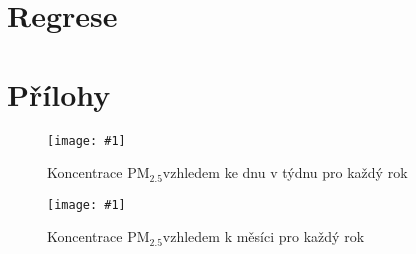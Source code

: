 \documentclass[a4paper,12pt]{article}
\newcommand{\pmQuant}[0]{$\text{PM}_{2.5}$}
\newcommand{\image}[4]{\begin{figure}[ht!] \centering \texttt{[image: \#1]} \caption{#2} \label{#3} \end{figure}}
\begin{document}
\section{Regrese}




\FloatBarrier
\newpage
\section{Přílohy}

\image{target_by_wd_by_year.pdf}{Koncentrace \pmQuant vzhledem ke dnu v týdnu pro každý rok}{fig:target_by_wd_yearly}{1.0}
\image{target_by_month_by_year.pdf}{Koncentrace \pmQuant vzhledem k měsíci pro každý rok}{fig:target_by_month_yearly}{1.0}
\end{document}
